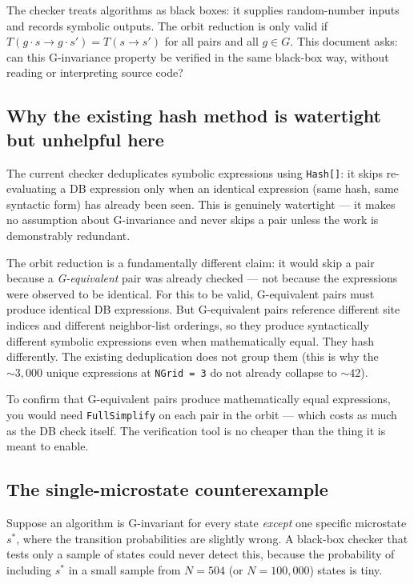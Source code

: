 \documentclass[11pt,a4paper]{article}
\begin{document}
The checker treats algorithms as black boxes: it supplies random-number
inputs and records symbolic outputs.  The orbit reduction is only valid if
$T(g{\cdot}s\to g{\cdot}s') = T(s\to s')$ for all pairs and all $g\in G$.
This document asks: can this G-invariance property be verified in the same
black-box way, without reading or interpreting source code?

\subsection*{Why the existing hash method is watertight but unhelpful here}

The current checker deduplicates symbolic expressions using
\texttt{Hash[]}: it skips re-evaluating a DB expression only when an
identical expression (same hash, same syntactic form) has already been
seen.  This is genuinely watertight --- it makes no assumption about
G-invariance and never skips a pair unless the work is demonstrably
redundant.

The orbit reduction is a fundamentally different claim: it would skip a
pair because a \emph{G-equivalent} pair was already checked --- not
because the expressions were observed to be identical.  For this to be
valid, G-equivalent pairs must produce identical DB expressions.  But
G-equivalent pairs reference different site indices and different
neighbor-list orderings, so they produce syntactically different symbolic
expressions even when mathematically equal.  They hash differently.  The
existing deduplication does not group them (this is why the
${\sim}3{,}000$ unique expressions at \texttt{NGrid\,=\,3} do not already
collapse to ${\sim}42$).

To confirm that G-equivalent pairs produce mathematically equal
expressions, you would need \texttt{FullSimplify} on each pair in the
orbit --- which costs as much as the DB check itself.  The verification
tool is no cheaper than the thing it is meant to enable.

\subsection*{The single-microstate counterexample}

Suppose an algorithm is G-invariant for every state \emph{except} one
specific microstate $s^*$, where the transition probabilities are
slightly wrong.  A black-box checker that tests only a sample of states
could never detect this, because the probability of including $s^*$ in a
small sample from $N=504$ (or $N=100{,}000$) states is tiny.
\end{document}

